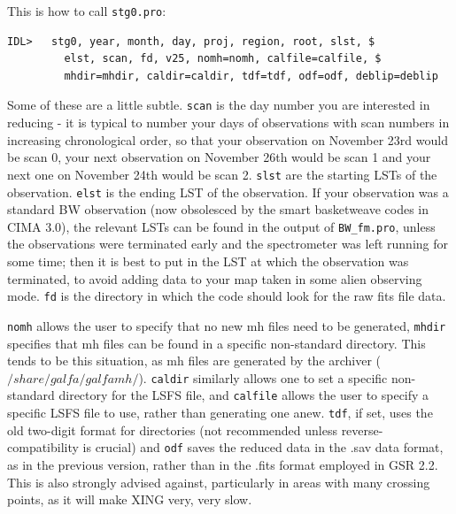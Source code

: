 \documentclass[11pt]{article}
\begin{document}
This is how to call \texttt{stg0.pro}:
\begin{verbatim}
IDL>   stg0, year, month, day, proj, region, root, slst, $
         elst, scan, fd, v25, nomh=nomh, calfile=calfile, $
         mhdir=mhdir, caldir=caldir, tdf=tdf, odf=odf, deblip=deblip
\end{verbatim}
Some of these are a little subtle. \texttt{scan} is the day number you are interested in reducing - it is typical to number your days of observations with scan numbers in increasing chronological order, so that your observation on November 23rd would be scan 0, your next observation on November 26th would be scan 1 and your next one on November 24th would be scan 2. \texttt{slst} are the starting LSTs of the observation. \texttt{elst} is the ending LST of the observation. If your observation was a standard BW observation (now obsolesced by the smart basketweave codes in CIMA 3.0), the relevant LSTs can be found in the output of \texttt{BW\_fm.pro}, unless the observations were terminated early and the spectrometer was left running for some time; then it is best to put in the LST at which the observation was terminated, to avoid adding data to your map taken in some alien observing mode. \texttt{fd} is the directory in which the code should look for the raw fits file data.


\texttt{nomh} allows the user to specify that no new mh files need to be generated, \texttt{mhdir} specifies that mh files can be found in a specific non-standard directory. This tends to be this situation, as mh files are generated by the archiver ($/share/galfa/galfamh/$). \texttt{caldir} similarly allows one to set a specific non-standard directory for the LSFS file, and \texttt{calfile} allows the user to specify a specific LSFS file to use, rather than generating one anew.  \texttt{tdf}, if set, uses the old two-digit format for directories (not recommended unless reverse-compatibility is crucial) and \texttt{odf} saves the reduced data in the .sav data format, as in the previous version, rather than in the .fits format employed in GSR 2.2. This is also strongly advised against, particularly in areas with many crossing points, as it will make XING very, very slow.
\end{document}
